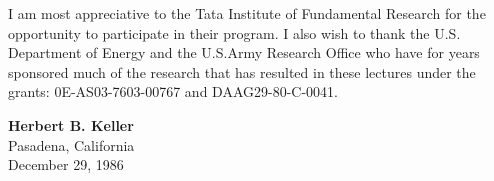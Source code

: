 I am most appreciative to the Tata Institute of Fundamental Research
for the opportunity to participate in their program. I also wish to
thank the U.S. Department of Energy and the U.S.Army Research Office
who have for years sponsored much of the research that has resulted in
these lectures under  the grants: 0E-AS03-7603-00767 and
DAAG29-80-C-0041.  
\bigskip


\begin{flushright}
{\large\bf Herbert B. Keller}\\
Pasadena, California \\
December 29, 1986
\end{flushright}

